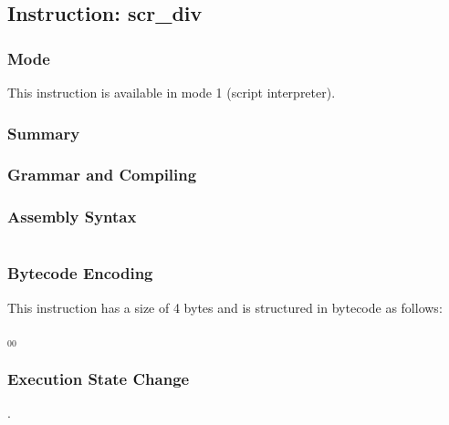 \subsection{Instruction: scr\_div}

\subsubsection{Mode}
This instruction is available in mode 1 (script interpreter).
\subsubsection{Summary}


\subsubsection{Grammar and Compiling}


\subsubsection{Assembly Syntax}

\begin{myquote}
\begin{verbatim}

\end{verbatim}
\end{myquote}

\subsubsection{Bytecode Encoding}

This instruction has a size of 4 bytes and is structured in bytecode as follows:

$_{00}$\ 

\subsubsection{Execution State Change}

.


